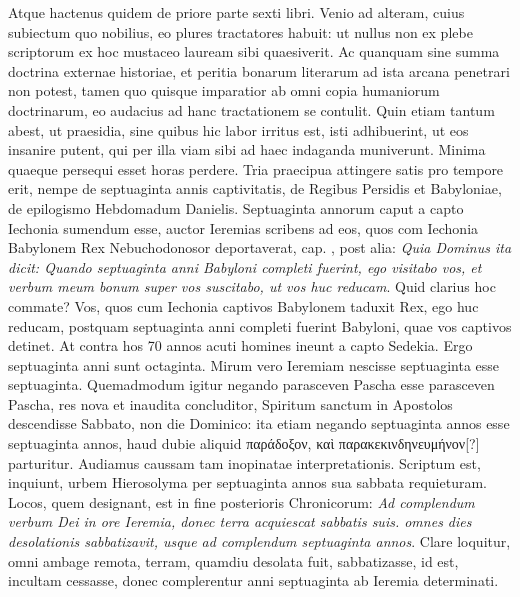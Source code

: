 Atque hactenus quidem de
priore parte sexti libri.
Venio ad alteram, cuius subiectum quo nobilius,
eo plures tractatores habuit: ut nullus non ex plebe scriptorum
ex hoc mustaceo lauream sibi quaesiverit.
Ac quanquam sine
summa doctrina externae historiae, et peritia bonarum literarum
ad ista arcana penetrari non potest, tamen quo quisque imparatior
ab omni copia humaniorum doctrinarum, eo audacius ad hanc
tractationem se contulit.
Quin etiam tantum abest, ut praesidia,
sine quibus hic labor irritus est, isti adhibuerint, ut eos insanire
putent, qui per illa viam sibi ad haec indaganda muniverunt.
Minima quaeque persequi esset horas perdere.
Tria praecipua attingere
satis pro tempore erit, nempe de septuaginta annis captivitatis,
de Regibus Persidis et Babyloniae, de epilogismo Hebdomadum
Danielis.
Septuaginta annorum caput a capto Iechonia sumendum
esse, auctor Ieremias scribens ad eos, quos com Iechonia Babylonem
Rex Nebuchodonosor deportaverat, cap. , post
alia: \textit{Quia Dominus ita dicit: Quando septuaginta anni Babyloni completi
fuerint, ego visitabo vos, et verbum meum bonum super vos
suscitabo, ut vos huc reducam}.
Quid clarius hoc commate?
Vos,
quos cum Iechonia captivos Babylonem taduxit Rex, ego huc
reducam, postquam septuaginta anni completi fuerint Babyloni,
quae vos captivos detinet.
At contra hos 70 annos acuti homines
ineunt a capto Sedekia.
Ergo septuaginta anni sunt octaginta.
Mirum vero Ieremiam nescisse septuaginta esse septuaginta.
Quemadmodum
igitur negando parasceven Pascha esse parasceven
Pascha, res nova et inaudita concluditor, Spiritum sanctum in 
Apostolos descendisse Sabbato, non die Dominico: ita etiam
negando septuaginta annos esse septuaginta annos, haud dubie
aliquid \textgreek{παράδοξον, καὶ παρακεκινδηνευμήνον[?]} parturitur.
Audiamus
caussam tam inopinatae interpretationis.
Scriptum est, inquiunt, urbem
Hierosolyma per septuaginta annos sua sabbata requieturam.
Locos, quem designant, est in fine posterioris Chronicorum:
\textit{Ad complendum verbum Dei in ore Ieremia,
 donec terra acquiescat sabbatis
suis. omnes dies desolationis sabbatizavit, usque ad complendum
septuaginta annos}.
Clare loquitur, omni ambage remota, terram,
quamdiu desolata fuit, sabbatizasse, id est, incultam cessasse, donec
complerentur anni septuaginta ab Ieremia determinati.

